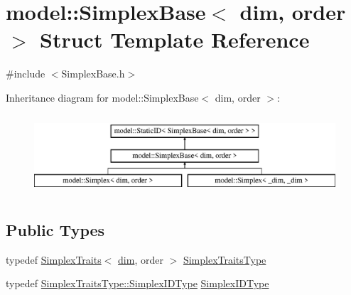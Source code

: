 \hypertarget{structmodel_1_1_simplex_base}{}\section{model\+:\+:Simplex\+Base$<$ dim, order $>$ Struct Template Reference}
\label{structmodel_1_1_simplex_base}


{\ttfamily \#include $<$Simplex\+Base.\+h$>$}

Inheritance diagram for model\+:\+:Simplex\+Base$<$ dim, order $>$\+:\begin{figure}[H]
\begin{center}
\leavevmode
\includegraphics[height=3.000000cm]{structmodel_1_1_simplex_base}
\end{center}
\end{figure}
\subsection*{Public Types}
\begin{DoxyCompactItemize}
\item 
typedef \hyperlink{structmodel_1_1_simplex_traits}{Simplex\+Traits}$<$ \hyperlink{plot_nd_a_8m_a382f3ca768b275b8d563604f7fc7df73}{dim}, order $>$ \hyperlink{structmodel_1_1_simplex_base_aa840eb117c09ab144b9ea09c11be5ed7}{Simplex\+Traits\+Type}
\item 
typedef \hyperlink{structmodel_1_1_simplex_traits_aea38aba3da1babde2d5f0c62f7862eae}{Simplex\+Traits\+Type\+::\+Simplex\+I\+D\+Type} \hyperlink{structmodel_1_1_simplex_base_a0caaeafb7f385ed49b6463a9e54a127c}{Simplex\+I\+D\+Type}
\end{DoxyCompactItemize}

